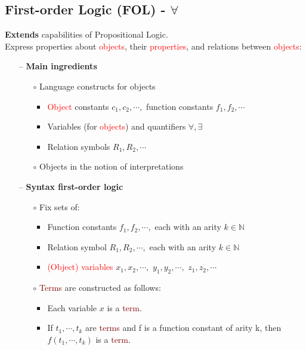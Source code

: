 \subsection{First-order Logic (FOL) - $\forall $}
\textbf{Extends} capabilities of Propositional Logic. \\
Express properties about \textcolor{red}{objects}, their \textcolor{red}{properties}, and \textcolor{NavyBlue}{relations} between \textcolor{red}{objects}:
\begin{itemize}
    \item[--] \textbf{Main ingredients}
    \begin{itemize}
        \item[$\circ$] Language constructs for objects
        \begin{itemize}
            \item \textcolor{red}{Object} constants $c_1, c_2, \cdots,$ function constants $f_1, f_2, \cdots$
            \item Variables (for \textcolor{red}{objects}) and quantifiers $\forall, \exists$
            \item \textcolor{PineGreen}{Relation} symbols $R_1, R_2, \cdots$
        \end{itemize}
        \item[$\circ$] Objects in the notion of interpretations
    \end{itemize}
    \newpage
    \item[--] \textbf{Syntax first-order logic}
    \begin{itemize}
        \item[$\circ$] Fix sets of:
        \begin{itemize}
            \item Function constants $f_1, f_2, \cdots,$ each with an arity $k \in \mathbb{N}$
            \item \textcolor{PineGreen}{Relation symbol} $R_1, R_2, \cdots,$ each with an arity $k \in \mathbb{N}$
            \item \textcolor{red}{(Object) variables} $x_1, x_2, \cdots,$ $y_1, y_2, \cdots,$ $z_1, z_2, \cdots$
        \end{itemize}
        \item[$\circ$] \textcolor{Maroon}{Terms} are constructed as follows:
        \begin{itemize}
            \item Each variable $x$ is a \textcolor{Maroon}{term}.
            \item If $t_1, \cdots, t_k$ are \textcolor{Maroon}{terms} and f is a function constant of arity k, then $f(t_1, \cdots, t_k)$ is a \textcolor{Maroon}{term}.

\end{itemize}
\end{itemize}
\end{itemize}
